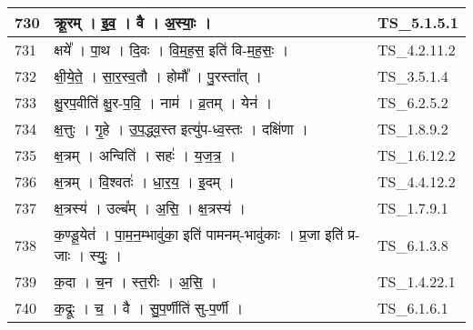 \documentclass[17pt]{extarticle}
\begin{document}
\begin{longtable}{||p{0.4in}||p{4.9in}||p{0.9in}||}
    \hline
        
    730 & क्रू॒रम्   ।   इ॒व॒   ।   वै   ।   अ॒स्याः॒   ।    & TS\_5.1.5.1       \\
    
    \hline
        
    731 & क्षये᳚   ।   पा॒थ   ।   दि॒वः   ।   वि॒म॒ह॒स॒ इति॑ वि{-}म॒ह॒सः॒   ।    & TS\_4.2.11.2       \\
    
    \hline
        
    732 & क्षी॒ये॒ते॒   ।   सा॒र॒स्व॒तौ   ।   होमौ᳚   ।   पु॒रस्ता᳚त्   ।    & TS\_3.5.1.4       \\
    
    \hline
        
    733 & क्षु॒रप॒वीति॑ क्षु॒र{-}प॒वि॒   ।   नाम॑   ।   व्र॒तम्   ।   येन॑   ।    & TS\_6.2.5.2       \\
    
    \hline
        
    734 & क्ष॒त्तुः   ।   गृ॒हे   ।   उ॒प॒द्ध्व॒स्त इत्यु॑प{-}ध्व॒स्तः   ।   दक्षि॑णा   ।    & TS\_1.8.9.2       \\
    
    \hline
        
    735 & क्ष॒त्रम्   ।   अन्विति॑   ।   सहः॑   ।   य॒ज॒त्र॒   ।    & TS\_1.6.12.2       \\
    
    \hline
        
    736 & क्ष॒त्रम्   ।   वि॒श्वतः॑   ।   धा॒र॒य॒   ।   इ॒दम्   ।    & TS\_4.4.12.2       \\
    
    \hline
        
    737 & क्ष॒त्रस्य॑   ।   उल्ब᳚म्   ।   अ॒सि॒   ।   क्ष॒त्रस्य॑   ।    & TS\_1.7.9.1       \\
    
    \hline
        
    738 & क॒ण्डू॒येत॑   ।   पा॒म॒न॒म्भावु॑का॒ इति॑ पामनम्{-}भावु॑काः   ।   प्र॒जा इति॑ प्र{-}जाः   ।   स्युः॒   ।    & TS\_6.1.3.8       \\
    
    \hline
        
    739 & क॒दा   ।   च॒न   ।   स्त॒रीः   ।   अ॒सि॒   ।    & TS\_1.4.22.1       \\
    
    \hline
        
    740 & क॒द्रूः   ।   च॒   ।   वै   ।   सु॒प॒र्णीति॑ सु{-}प॒र्णी   ।    & TS\_6.1.6.1       \\
    

\end{longtable}
\end{document}
